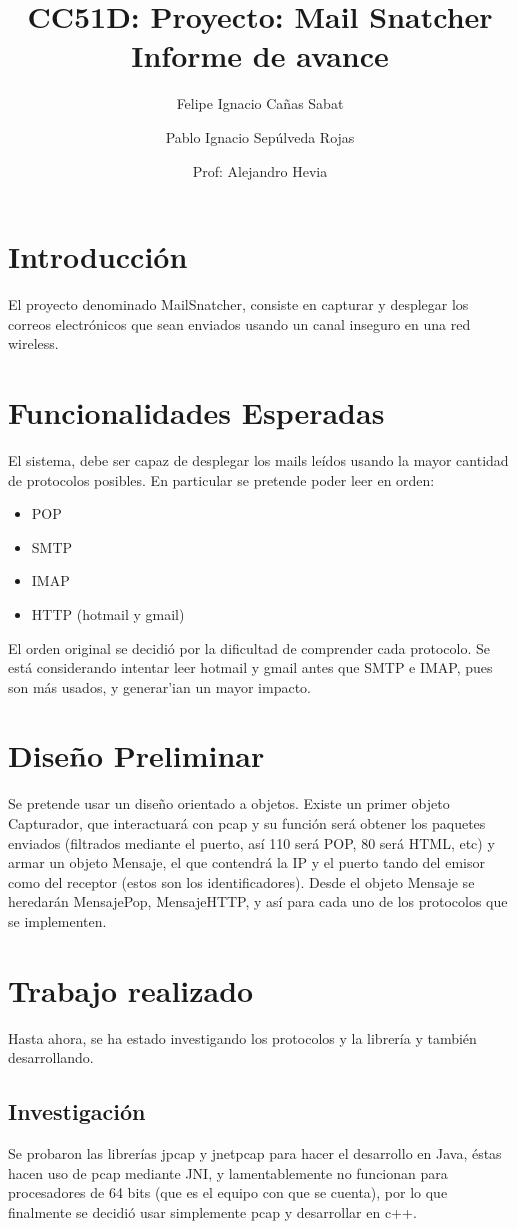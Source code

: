 \documentclass[titlepage]{article}
\title{CC51D: Proyecto: Mail Snatcher \\Informe de avance}
\author{Felipe Ignacio Ca\~nas Sabat \and Pablo Ignacio Sep\'ulveda Rojas
\and Prof: Alejandro Hevia}
\begin{document}
\maketitle
\section{Introducci\'on}
El proyecto denominado MailSnatcher, consiste en capturar y desplegar los
correos electr\'onicos que sean enviados usando un canal inseguro en una red
wireless.
\section{Funcionalidades Esperadas}
El sistema, debe ser capaz de desplegar los mails le\'idos usando la mayor
cantidad de protocolos posibles. En particular se pretende poder leer en orden:
\begin{itemize}
\item POP
\item SMTP
\item IMAP
\item HTTP (hotmail y gmail)
\end{itemize} 
El orden original se decidi\'o por la dificultad de comprender cada protocolo. 
Se est\'a considerando intentar leer hotmail y gmail antes que SMTP e IMAP,
pues son m\'as usados, y generar'ian un mayor impacto.
\section{Dise\~no Preliminar}
Se pretende usar un dise\~no orientado a objetos. Existe un primer objeto
Capturador, que interactuar\'a con pcap y su funci\'on ser\'a obtener los
paquetes enviados (filtrados mediante el puerto, as\'i 110 ser\'a POP, 80
ser\'a HTML, etc) y armar un objeto Mensaje, el que contendr\'a la IP y el
puerto tando del emisor como del receptor (estos son los identificadores).
Desde el objeto Mensaje se heredar\'an MensajePop, MensajeHTTP, y as\'i para
cada uno de los protocolos que se implementen.
\section{Trabajo realizado}
Hasta ahora, se ha estado investigando los protocolos y la librer\'ia y 
tambi\'en desarrollando.
\subsection{Investigaci\'on}
Se probaron las librer\'ias jpcap y jnetpcap para hacer el desarrollo en Java,
\'estas hacen uso de pcap mediante JNI, y lamentablemente no funcionan para 
procesadores de 64 bits (que es el equipo con que se cuenta), por lo que 
finalmente se decidi\'o usar simplemente pcap y desarrollar en c++.
\end{document}
